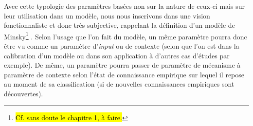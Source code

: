 Avec cette typologie des paramètres basées non sur la nature de ceux-ci mais sur leur utilisation dans un modèle, nous nous inscrivons dans une vision fonctionnaliste et donc très subjective, rappelant la définition d'un modèle de Minsky\footnote{\hl{Cf. sans doute le chapitre 1, à faire.}} \autocite{minsky_matter_1965}.
Selon l'usage que l'on fait du modèle, un même paramètre pourra donc être vu comme un paramètre d'\textit{input} ou de contexte (selon que l'on est dans la calibration d'un modèle ou dans son application à d'autres cas d'études par exemple).
De même, un paramètre pourra passer de paramètre de mécanisme à paramètre de contexte selon l'état de connaissance empirique sur lequel il repose au moment de sa classification (si de nouvelles connaissances empiriques sont \og découvertes\fg{}).


